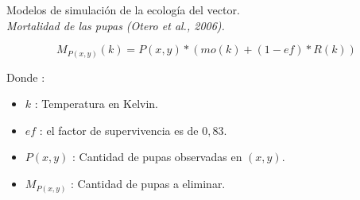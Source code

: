 {
\begin{frame}[c]{Modelos de simulación de la ecología del vector.\\\textit{Mortalidad de las pupas (Otero et al., 2006).}}
  \begin{center}
    \begin{equation}
        M_{P(x,y)}(k) = P(x,y) * (mo(k) + (1 - ef) * R(k))
    \end{equation}
  \end{center}
  Donde :
    \begin{itemize}
      \item $k$ : Temperatura en Kelvin.
      \item $ef$ : el factor de supervivencia es de $0,83$.
      \item $P(x, y)$ : Cantidad de pupas observadas en $(x,y)$.
      \item $M_{P(x,y)}$ : Cantidad de pupas a eliminar.
    \end{itemize}
\end{frame}
}


